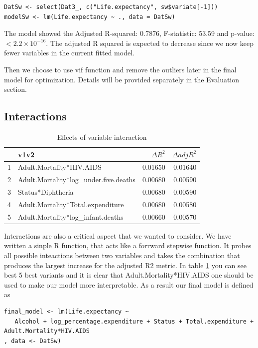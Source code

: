 \begin{verbatim}
DatSw <- select(Dat3_, c("Life.expectancy", sw$variate[-1]))
modelSw <- lm(Life.expectancy ~ ., data = DatSw)
\end{verbatim}

The model showed the Adjusted R-squared:  0.7876, F-statistic: 53.59 and p-value: $< 2.2\times 10^{-16}$. The adjusted R squared is expected to decrease since we now keep fewer variables in the current fitted model.

Then we choose to use vif function and remove the outliers later in the final model for optimization. Details will be provided separately in the Evaluation section. 

\subsection{Interactions}

\begin{table}[ht]
\centering
\begin{tabular}{rlrr}
  \hline
 & v1v2 & $\Delta R^2$ & $\Delta adjR^2$ \\ 
  \hline
1 & Adult.Mortality*HIV.AIDS & 0.01650 & 0.01640 \\ 
  2 & Adult.Mortality*log\_under.five.deaths & 0.00680 & 0.00590 \\ 
  3 & Status*Diphtheria & 0.00680 & 0.00590 \\ 
  4 & Adult.Mortality*Total.expenditure & 0.00680 & 0.00580 \\ 
  5 & Adult.Mortality*log\_infant.deaths & 0.00660 & 0.00570 \\ 
   \hline
\end{tabular}
\caption{Effects of variable interaction} 
\label{tab:int}
\end{table}

Interactions are also a critical aspect that we wanted to consider. We have written a sinple R function, that acts like a forrward stepwise function. It probes all possible inteactions between two variables and takes the combination that produces the largest increase for the adjusted R2 metric. In table \ref{tab:int} you can see best 5 best variants and it is clear that  Adult.Mortality*HIV.AIDS one should be used to make our model more interpretable. As a result our final model is defined as
\begin{verbatim}
final_model <- lm(Life.expectancy ~ 
   Alcohol + log_percentage.expenditure + Status + Total.expenditure + Adult.Mortality*HIV.AIDS
, data <- DatSw)
\end{verbatim}

